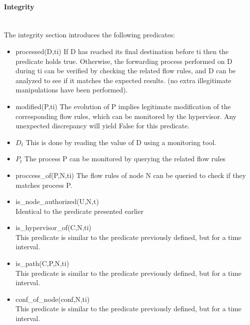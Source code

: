 \paragraph{Integrity}\textbf{\\}
The integrity section introduces the following predicates:
\begin{itemize}

\item processed(D,ti)
\newline
If D has reached its final destination before ti then the predicate holds true.
Otherwise, the forwarding process performed on D during ti can be verified by checking the related flow rules, and D can be analyzed to see if it matches the expected results. (\ie no extra illegitimate manipulations have been performed).

\item modified(P,ti)
\newline
The evolution of P implies legitimate modification of the corresponding flow rules, which can be monitored by the hypervisor. Any unexpected discrepancy will yield False for this predicate.

\item $D_{t}$
\newline
This is done by reading the value of D using a monitoring tool.

\item $P_t$
\newline
The process P can be monitored by querying the related flow rules

\item proccess\_of(P,N,ti)
\newline
The flow rules of node N can be queried to check if they matches process P.

\item is\_node\_authorized(U,N,t)\\
Identical to the predicate presented earlier

\item is\_hypervisor\_of(C,N,ti)\\
This predicate is similar to the predicate previously defined, but for a time interval.

\item is\_path(C,P,N,ti)\\
This predicate is similar to the predicate previously defined, but for a time interval.

\item conf\_of\_node(conf,N,ti)\\
This predicate is similar to the predicate previously defined, but for a time interval.

\end{itemize}

